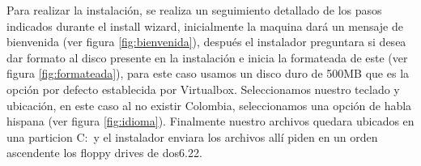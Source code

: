 \documentclass[paper=a4, fontsize=12pt]{article} 		%
\numberwithin{equation}{section}						%
\numberwithin{table}{section} 							%
\begin{document}
\begin{figure}[H]
 	\centering
\end{figure}
Para realizar la instalación, se realiza un seguimiento detallado de los pasos indicados durante el install wizard,
inicialmente la maquina dará un mensaje de bienvenida (ver figura \ref{fig:bienvenida}), después el instalador preguntara si desea dar formato al disco presente en la instalación e inicia la formateada de este (ver figura \ref{fig:formateada}), para este caso usamos un disco duro de 500MB que es la opción por defecto establecida por Virtualbox. Seleccionamos nuestro teclado y ubicación, en este caso al no existir Colombia, seleccionamos una opción de habla hispana (ver figura \ref{fig:idioma}). Finalmente nuestro archivos quedara ubicados en una particion C:\ y el instalador enviara los archivos allí piden en un orden ascendente los floppy drives de dos6.22. 
\end{document}
